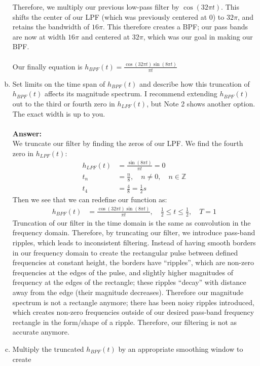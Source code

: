 \documentclass[12pt, a4paper]{article}
\def\Z{\mathbb Z}
\begin{document}
\begin{enumerate}[(a)]
Therefore, we multiply our previous low-pass filter by $\cos(32\pi t)$. This shifts the center of our LPF (which was previously centered at 0) to $32 \pi$, and retains the bandwidth of $16 \pi$. This therefore creates a BPF; our pass bands are now at width $16 \pi$ and centered at $32 \pi$, which was our goal in making our BPF. \\ \\
Our finally equation is $h_{BPF}(t) = \frac{\cos(32\pi t)\sin(8\pi t)}{\pi t}$
\item Set limits on the time span of $h_{BPF}(t)$ and describe how this truncation of $h_{BPF}(t)$
affects its magnitude spectrum. I recommend extending $h_{BPF}(t)$ out to the third or
fourth zero in $h_{LPF}(t)$, but Note 2 shows another option. The exact width is up to you. \\ \\
\textbf{Answer: } \\
We truncate our filter by finding the zeros of our LPF. We find the fourth zero in $h_{LPF}(t)$:
\begin{align*}
h_{LPF}(t) &= \frac{\sin(8\pi t)}{\pi t} = 0 \\
t_n &= \frac{n}{8}, \quad n \neq 0, \quad n \in \Z \\
t_4 &= \frac{4}{8} = \frac{1}{2} s
\end{align*}
Then we see that we can redefine our function as:
\begin{align*}
h_{BPF}(t) &= \frac{\cos(32\pi t)\sin(8\pi t)}{\pi t}, \quad \frac{1}{2} \leq t \leq \frac{1}{2}, \quad T = 1
\end{align*}
Truncation of our filter in the time domain is the same as convolution in the frequency domain. Therefore, by truncating our filter, we introduce pass-band ripples, which leads to inconsistent filtering. Instead of having smooth borders in our frequency domain to create the rectangular pulse between defined frequencies at constant height, the borders have ``ripples'', which are non-zero frequencies at the edges of the pulse, and slightly higher magnitudes of frequency at the edges of the rectangle; these ripples ``decay'' with distance away from the edge (their magnitude decreases). Therefore our magnitude spectrum is not a rectangle anymore; there has been noisy ripples introduced, which creates non-zero frequencies outside of our desired pass-band frequency rectangle in the form/shape of a ripple. Therefore, our filtering is not as accurate anymore.
\item Multiply the truncated $h_{BPF}(t)$ by an appropriate smoothing window to create

\end{enumerate}
\end{document}

